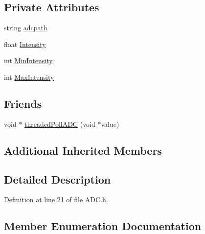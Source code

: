 \subsection*{Private Attributes}
\begin{DoxyCompactItemize}
\item 
string \hyperlink{class_hardware_1_1_a_d_c_a820ce4f097a70b95246049f9ea01df21}{adcpath}
\item 
float \hyperlink{class_hardware_1_1_a_d_c_a38a0f00558a3de01b3bce567643dae4a}{Intensity}
\item 
int \hyperlink{class_hardware_1_1_a_d_c_af73224014dddfdd80f77b80e6ed82c13}{Min\+Intensity}
\item 
int \hyperlink{class_hardware_1_1_a_d_c_a8fb4ac4b41ff54a44e57e9ce8bc5bd93}{Max\+Intensity}
\end{DoxyCompactItemize}
\subsection*{Friends}
\begin{DoxyCompactItemize}
\item 
void $\ast$ \hyperlink{class_hardware_1_1_a_d_c_a626f06adb6721fc5fe0aa7f76a770770}{threaded\+Poll\+A\+D\+C} (void $\ast$value)
\end{DoxyCompactItemize}
\subsection*{Additional Inherited Members}


\subsection{Detailed Description}


Definition at line 21 of file A\+D\+C.\+h.



\subsection{Member Enumeration Documentation}
\hypertarget{class_hardware_1_1_a_d_c_adb1507998c096cbdf7031527f6a690cf}{}
